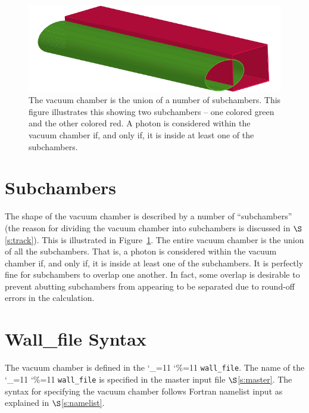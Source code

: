 \documentclass[11pt,openany]{report}
\newcommand{\sref}[1]{$\S$\ref{#1}}
\newcommand\ttcmd{\begingroup\catcode`\_=11 \catcode`\%=11 \dottcmd}
\newcommand\dottcmd[1]{\texttt{#1}\endgroup}
\newcommand{\fig}[1]{Figure~\ref{#1}}
\newcommand{\vn}{\ttcmd}
\begin{document}
\begin{figure}[bt]
\begin{center}
\includegraphics[width=5in]{vac-pipe.pdf} \caption[The vacuum chamber is the union of a
number of subchambers.]{The vacuum chamber is the union of a number of subchambers.
This figure illustrates this showing two subchambers -- one colored green and the other
colored red. A photon is considered within the vacuum chamber if, and only if, it is
inside at least one of the subchambers.}
\label{f:vac-chamber}
\end{center}
\end{figure}

\section{Subchambers}
\label{s:sub.chambers}

The shape of the vacuum chamber is described by a number of ``subchambers'' (the reason
for dividing the vacuum chamber into subchambers is discussed in \sref{s:track}). This is
illustrated in \fig{f:vac-chamber}. The entire vacuum chamber is the union of all the
subchambers. That is, a photon is considered within the vacuum chamber if, and only if,
it is inside at least one of the subchambers. It is perfectly fine for subchambers to
overlap one another. In fact, some overlap is desirable to prevent abutting subchambers
from appearing to be separated due to round-off errors in the calculation.

\section{Wall_file Syntax}
\label{s:wall.file}

The vacuum chamber is defined in the \vn{wall_file}. The name of the \vn{wall_file} is
specified in the master input file \sref{s:master}. The syntax for specifying the vacuum
chamber follows Fortran namelist input as explained in \sref{s:namelist}.
\end{document}
